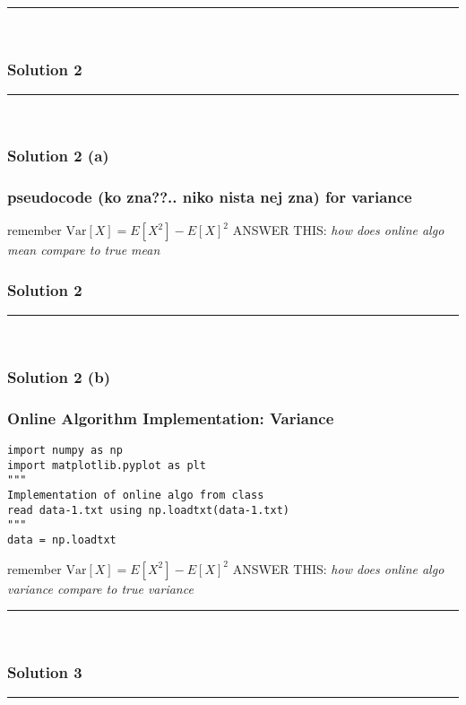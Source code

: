 \documentclass{article}
\begin{document}
\noindent\rule{\textwidth}{0.4pt}\\

\newpage

\subsubsection*{Solution 2}
\noindent\rule{\textwidth}{0.4pt}\\
\subsubsection*{Solution 2 (a)}
\subsubsection*{pseudocode (ko zna??.. niko nista nej zna) for variance}
\parbox{\textwidth}{
remember $\text{Var}[X]=E[X^2]-E[X]^2$
ANSWER THIS: \textit{how does online algo mean compare to true mean}
}

\subsubsection*{Solution 2}
\noindent\rule{\textwidth}{0.4pt}\\
\subsubsection*{Solution 2 (b)}
\subsubsection*{Online Algorithm Implementation: Variance}

\begin{lstlisting}
import numpy as np
import matplotlib.pyplot as plt
"""
Implementation of online algo from class
read data-1.txt using np.loadtxt(data-1.txt)
"""
data = np.loadtxt
\end{lstlisting}

\parbox{\textwidth}{
remember $\text{Var}[X]=E[X^2]-E[X]^2$
ANSWER THIS: \textit{how does online algo variance compare to true variance}
}

\noindent\rule{\textwidth}{0.4pt}\\

\newpage
\subsubsection*{Solution 3}
\noindent\rule{\textwidth}{0.4pt}\\
\end{document}
